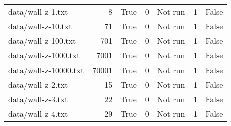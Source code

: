\begin{tabular}{lrrrrrr}
data/wall-z-1.txt & 8 & True & 0 & Not run & 1 & False \\
data/wall-z-10.txt & 71 & True & 0 & Not run & 1 & False \\
data/wall-z-100.txt & 701 & True & 0 & Not run & 1 & False \\
data/wall-z-1000.txt & 7001 & True & 0 & Not run & 1 & False \\
data/wall-z-10000.txt & 70001 & True & 0 & Not run & 1 & False \\
data/wall-z-2.txt & 15 & True & 0 & Not run & 1 & False \\
data/wall-z-3.txt & 22 & True & 0 & Not run & 1 & False \\
data/wall-z-4.txt & 29 & True & 0 & Not run & 1 & False \\
\end{tabular}